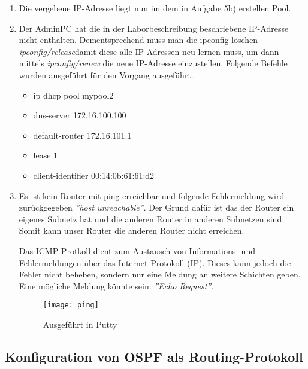 \documentclass{scrartcl}
\begin{document}
\begin{enumerate}
   \item
   Die vergebene IP-Adresse liegt nun im dem in Aufgabe 5b) erstellen Pool.

	\item
	Der AdminPC hat die in der Laborbeschreibung beschriebene IP-Adresse nicht enthalten. Dementsprechend muss man die ipconfig löschen \textit{ipconfig/release}damit diese alle IP-Adressen neu lernen muss, um dann mittels \textit{ipconfig/renew} die neue IP-Adresse einzustellen. Folgende Befehle wurden ausgeführt für den Vorgang ausgeführt.
	\begin{itemize}
	\item ip dhcp pool mypool2
	\item dns-server 172.16.100.100
	\item default-router 172.16.101.1
	\item lease 1
	\item client-identifier 00:14:0b:61:61:d2
	\end{itemize}

   \item
   Es ist kein Router mit ping erreichbar und folgende Fehlermeldung wird zurückgegeben \textit{''host unreachable''}. Der Grund dafür ist das der Router ein eigenes Subnetz hat und die anderen Router in anderen Subnetzen sind. Somit kann unser Router die anderen Router nicht erreichen.
   
   Das ICMP-Protkoll dient zum Austausch von Informations- und Fehlermeldungen über das Internet Protokoll (IP). Dieses kann jedoch die Fehler nicht beheben, sondern nur eine Meldung an weitere Schichten geben. Eine mögliche Meldung könnte sein: \textit{''Echo Request''}.
   
   \begin{figure}[htbp]
   \centering
   \texttt{[image: ping]}
   \label{fig:ping}
	\caption{Ausgeführt in Putty}   
   \end{figure}
   \end{enumerate}
   
   \subsection[Augabe 6 Konfiguration von OSPF als Routing-Protokoll]{Konfiguration von OSPF als Routing-Protokoll}
   
\end{document}
